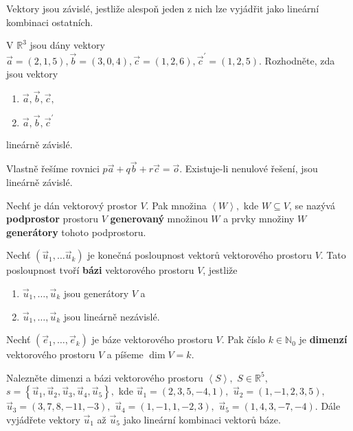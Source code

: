 \begin{veta}
    Vektory jsou závislé, jestliže alespoň jeden z nich lze vyjádřit jako lineární
    kombinaci ostatních.
\end{veta}

\begin{priklad}
V $\mathbb R^3$ jsou dány vektory $\vec a = (2,1,5), \vec b = (3,0,4), \vec c=(1,2,6),
\vec c^\prime = (1,2,5).$ Rozhodněte, zda jsou vektory
\begin{enumerate}[$a.$]
\item $\vec a, \vec b,\vec c,$
\item $\vec a, \vec b,\vec c^\prime$
\end{enumerate}
lineárně závislé.
\end{priklad}

\begin{reseni}
Vlastně řešíme rovnici $p\vec a + q\vec b + r\vec c= \vec o.$ Existuje-li nenulové
řešení, jsou lineárně závislé.
\end{reseni}

\begin{definition}
    Nechť je dán vektorový prostor $V$. Pak množina $\left < W \right >,$ kde $
    W\subseteq V$, se nazývá \textbf{podprostor} prostoru $V$ \textbf{generovaný}
    množinou $W$ a prvky množiny $W$ \textbf{generátory} tohoto podprostoru.
\end{definition}

\begin{definition}
    Nechť $(\vec u_1, \dots \vec u_k)$ je konečná posloupnost vektorů vektorového
    prostoru $V$. Tato posloupnost tvoří \textbf{bázi} vektorového prostoru $V$, jestliže
    \begin{enumerate}[$i.$]
    \item $\vec u_1, \dots, \vec u_k$ jsou generátory $V$ a
   	\item $\vec u_1, \dots, \vec u_k$ jsou lineárně nezávislé.
    \end{enumerate}
\end{definition}

\begin{definition}
Nechť $(\vec e_1,\dots, \vec e_k)$ je báze vektorového prostoru $V$. Pak číslo $k \in
\mathbb N_0$ je \textbf{dimenzí} vektorového prostoru $V$ a píšeme $\dim V=k$.
\end{definition}

\begin{priklad}
Nalezněte dimenzi a bázi vektorového prostoru $\left < S \right >, $ $S \in \mathbb R^{5},$ $s = \left
\{ \vec u_1,\vec u_2,\vec u_3,\vec u_4,\vec u_5 \right \}, $
kde
$\vec u_1=(2,3,5,-4,1),$ $\vec u_2=(1,-1,2,3,5),$ $\vec u_3=(3,7,8,-11,-3),$ $\vec u_4=(1,-1,1,-2,3),$ $\vec u_5=(1,4,3,-7,-4).$
Dále vyjádřete vektory $\vec u_1$ až $\vec u_5$ jako lineární kombinaci vektorů báze.
\end{priklad}

